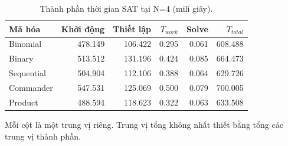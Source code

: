 \begin{table}[pos=H]
\centering
\small
\caption{Thành phần thời gian SAT tại N=4 (mili giây).}
\label{tab:small_n}
\setlength{\tabcolsep}{4pt}
\begin{tabular}{@{}lrrrrr@{}}
\toprule
Mã hóa & Khởi động & Thiết lập & $T_{work}$ & Solve & $T_{total}$ \\
\midrule
Binomial & 478.149 & 106.422 & 0.295 & 0.061 & 608.488 \\
Binary & 513.512 & 131.196 & 0.424 & 0.085 & 664.473 \\
Sequential & 504.904 & 112.106 & 0.388 & 0.064 & 629.726 \\
Commander & 547.531 & 125.069 & 0.500 & 0.079 & 700.005 \\
Product & 488.594 & 118.623 & 0.322 & 0.063 & 633.508 \\
\bottomrule
\end{tabular}
\par\smallskip\begin{minipage}{\linewidth}\footnotesize Mỗi cột là một trung vị riêng. Trung vị tổng không nhất thiết bằng tổng các trung vị thành phần.\end{minipage}
\end{table}
